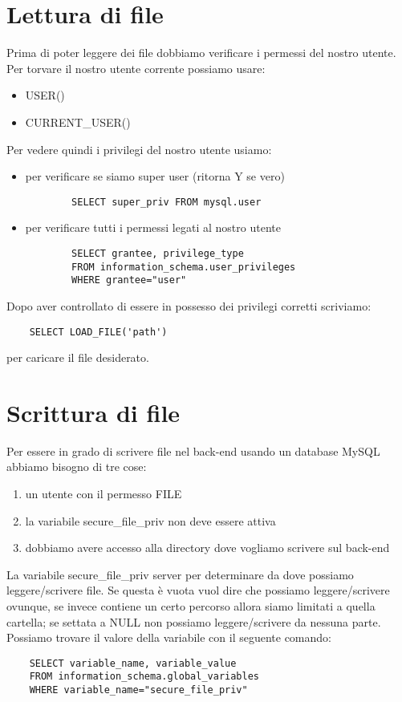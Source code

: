 \documentclass[oneside,a4paper,11pt]{book}
\theoremstyle{italicstyle}
\theoremstyle{normStyle}
\begin{document}
\section{Lettura di file}
Prima di poter leggere dei file dobbiamo verificare i permessi del nostro utente. Per torvare il nostro utente corrente possiamo usare:
\begin{itemize}
    \item USER()
    \item CURRENT\_USER()
\end{itemize}
Per vedere quindi i privilegi del nostro utente usiamo:
\begin{itemize}
    \item per verificare se siamo super user (ritorna Y se vero)
    \begin{verbatim}
        SELECT super_priv FROM mysql.user
    \end{verbatim}
    \item per verificare tutti i permessi legati al nostro utente
    \begin{verbatim}
        SELECT grantee, privilege_type 
        FROM information_schema.user_privileges 
        WHERE grantee="user"
    \end{verbatim}
\end{itemize}

Dopo aver controllato di essere in possesso dei privilegi corretti scriviamo:
\begin{verbatim}
    SELECT LOAD_FILE('path')
\end{verbatim}
per caricare il file desiderato.

\section{Scrittura di file}
Per essere in grado di scrivere file nel back-end usando un database MySQL abbiamo bisogno di tre cose:
\begin{enumerate}
    \item un utente con il permesso FILE
    \item la variabile secure\_file\_priv non deve essere attiva
    \item dobbiamo avere accesso alla directory dove vogliamo scrivere sul back-end
\end{enumerate}
La variabile secure\_file\_priv server per determinare da dove possiamo leggere/scrivere file. Se questa è vuota vuol dire che possiamo leggere/scrivere ovunque, se invece contiene un certo percorso allora siamo limitati a quella cartella; se settata a NULL non possiamo leggere/scrivere da nessuna parte. Possiamo trovare il valore della variabile con il seguente comando:
\begin{verbatim}
    SELECT variable_name, variable_value 
    FROM information_schema.global_variables 
    WHERE variable_name="secure_file_priv"
\end{verbatim}
\end{document}
